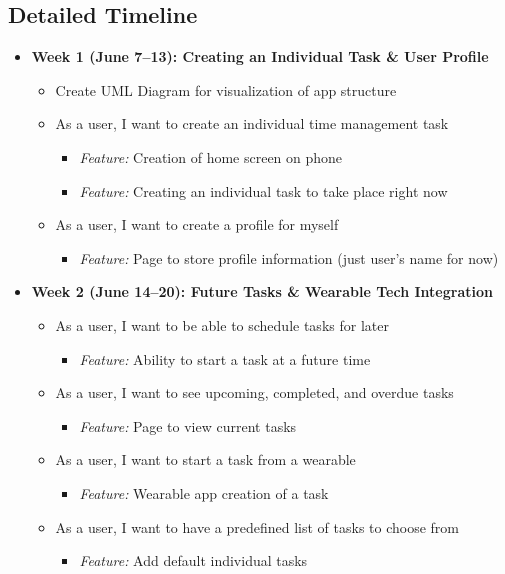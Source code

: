 \documentclass[12pt,letterpaper]{article}
\begin{document}
\subsection{Detailed Timeline}

\begin{itemize}
  \item \textbf{Week 1 (June 7--13): Creating an Individual Task \& User Profile}
  \begin{itemize}
    \item Create UML Diagram for visualization of app structure
    \item As a user, I want to create an individual time management task
    \begin{itemize}
      \item \textit{Feature:} Creation of home screen on phone
      \item \textit{Feature:} Creating an individual task to take place right now
    \end{itemize}
    \item As a user, I want to create a profile for myself
    \begin{itemize}
      \item \textit{Feature:} Page to store profile information (just user’s name for now)
    \end{itemize}
  \end{itemize}
  
  \item \textbf{Week 2 (June 14--20): Future Tasks \& Wearable Tech Integration}
  \begin{itemize}
    \item As a user, I want to be able to schedule tasks for later
    \begin{itemize}
      \item \textit{Feature:} Ability to start a task at a future time
    \end{itemize}
    \item As a user, I want to see upcoming, completed, and overdue tasks
    \begin{itemize}
      \item \textit{Feature:} Page to view current tasks
    \end{itemize}
    \item As a user, I want to start a task from a wearable
    \begin{itemize}
      \item \textit{Feature:} Wearable app creation of a task
    \end{itemize}
    \item As a user, I want to have a predefined list of tasks to choose from
    \begin{itemize}
      \item \textit{Feature:} Add default individual tasks
    \end{itemize}
  \end{itemize}
  

\end{itemize}
\end{document}
